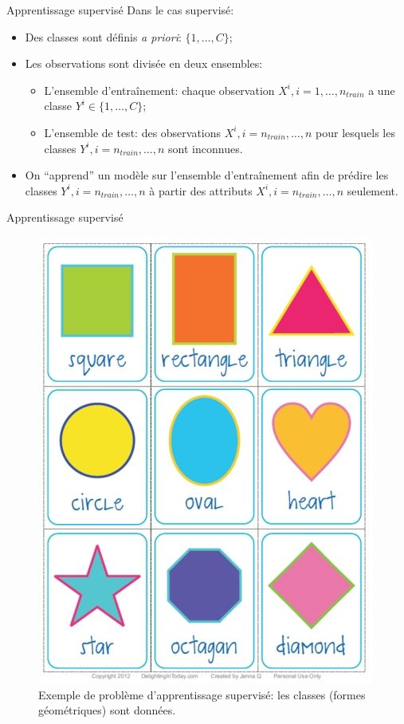 \documentclass[8pt]{beamer}
\begin{document}
			\begin{frame}{Apprentissage supervisé}
				Dans le cas supervisé:
				\begin{itemize}
					\item<1-> Des classes sont définis \textit{a priori}: \(\{1,\dots, C\}\);
					\item<2-> Les observations sont divisée en deux ensembles:
						\begin{itemize}
							\item<3-> L'ensemble d'entraînement: chaque observation \(X^i, i=1,\dots,n_{train}\) a une classe \(Y^i \in \{1,\dots, C\}\);
							\item<4-> L'ensemble de test: des observations \(X^i, i=n_{train},\dots,n\) pour lesquels les classes \(Y^i, i=n_{train},\dots,n\) sont inconnues.
						\end{itemize}
					\item<5-> On ``apprend'' un modèle sur l'ensemble d'entraînement afin de prédire les classes \(Y^i, i=n_{train},\dots,n\) à partir des attributs \(X^i, i=n_{train},\dots,n\) seulement.
				\end{itemize}
			\end{frame}

			\begin{frame}{Apprentissage supervisé}
				\begin{figure}[H]
					\includegraphics[height=.55\textheight]{images/samples/shapes_supervised}
					\caption*{Exemple de problème d'apprentissage supervisé: les classes (formes géométriques) sont données.}
				\end{figure}
			\end{frame}
\end{document}
